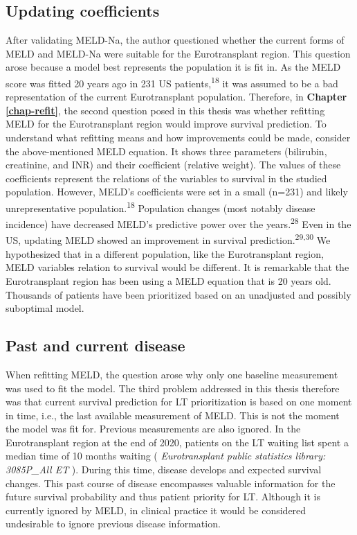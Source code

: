 \documentclass[11pt,english,]{book} %
\begin{document}
\hypertarget{updating-coefficients}{%
\subsection*{Updating coefficients}\label{updating-coefficients}}

After validating MELD-Na, the author questioned whether the current forms of MELD and MELD-Na were suitable for the Eurotransplant region. This question arose because a model best represents the population it is fit in. As the MELD score was fitted 20 years ago in 231 US patients,\textsuperscript{18} it was assumed to be a bad representation of the current Eurotransplant population. Therefore, in \textbf{Chapter \ref{chap-refit}}, the second question posed in this thesis was whether refitting MELD for the Eurotransplant region would improve survival prediction. To understand what refitting means and how improvements could be made, consider the above-mentioned MELD equation. It shows three parameters (bilirubin, creatinine, and INR) and their coefficient (relative weight). The values of these coefficients represent the relations of the variables to survival in the studied population. However, MELD's coefficients were set in a small (n=231) and likely unrepresentative population.\textsuperscript{18} Population changes (most notably disease incidence) have decreased MELD's predictive power over the years.\textsuperscript{28} Even in the US, updating MELD showed an improvement in survival prediction.\textsuperscript{29,30} We hypothesized that in a different population, like the Eurotransplant region, MELD variables relation to survival would be different. It is remarkable that the Eurotransplant region has been using a MELD equation that is 20 years old. Thousands of patients have been prioritized based on an unadjusted and possibly suboptimal model.

\hypertarget{past-and-current-disease}{%
\subsection*{Past and current disease}\label{past-and-current-disease}}

When refitting MELD, the question arose why only one baseline measurement was used to fit the model. The third problem addressed in this thesis therefore was that current survival prediction for LT prioritization is based on one moment in time, i.e., the last available measurement of MELD. This is not the moment the model was fit for. Previous measurements are also ignored. In the Eurotransplant region at the end of 2020, patients on the LT waiting list spent a median time of 10 months waiting ( \emph{Eurotransplant public statistics library: 3085P\_All ET} ). During this time, disease develops and expected survival changes. This past course of disease encompasses valuable information for the future survival probability and thus patient priority for LT. Although it is currently ignored by MELD, in clinical practice it would be considered undesirable to ignore previous disease information.
\end{document}
